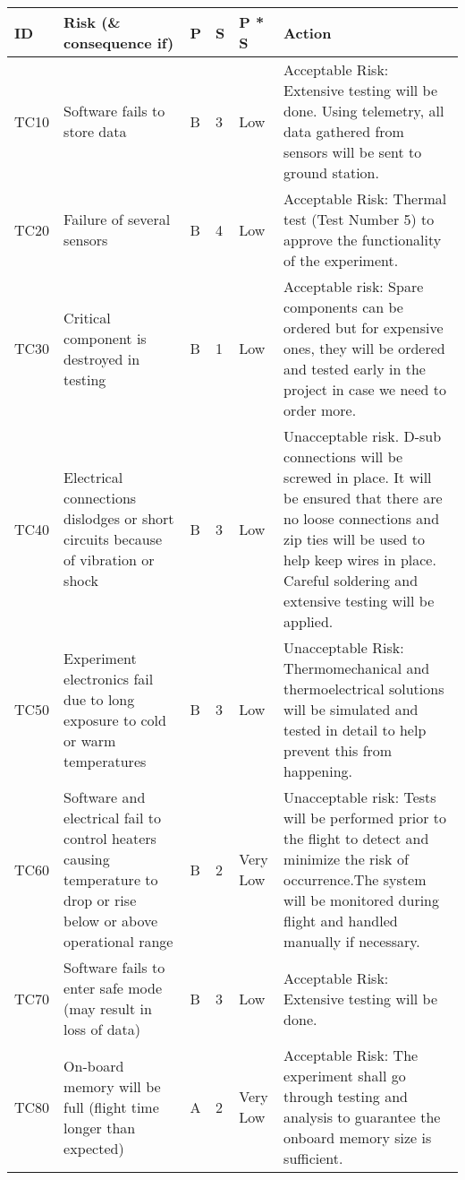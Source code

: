 


\begin{longtable}{|m{}| m{} |m{} |m{}|m{}| m{}|}

\hline
\textbf{ID} & \textbf{Risk (\& consequence if)} & \textbf{P} & \textbf{S} & \textbf{P * S} & \textbf{Action} \\ \hline
TC10 & Software fails to store data & B & 3 & \cellcolor[HTML]{FCFF2F}Low & Acceptable Risk: Extensive testing will be done. Using telemetry, all data gathered from sensors will be sent to ground station. \\ \hline
TC20 & Failure of several sensors & B & 4 & \cellcolor[HTML]{FCFF2F}Low & Acceptable Risk: Thermal test (Test Number 5) to approve the functionality of the experiment. \\ \hline
TC30 & Critical component is destroyed in testing & B & 1 & \cellcolor[HTML]{FCFF2F}Low & Acceptable risk: Spare components can be ordered but for expensive ones, they will be ordered and tested early in the project in case we need to order more. \\ \hline
TC40 & Electrical connections dislodges or short circuits because of vibration or shock & B & 3 & \cellcolor[HTML]{FCFF2F}Low & Unacceptable risk. D-sub connections will be screwed in place. It will be ensured that there are no loose connections and zip ties will be used to help keep wires in place. Careful soldering and extensive testing will be applied. \\ \hline
TC50 & Experiment electronics fail due to long exposure to cold or warm temperatures & B & 3 & \cellcolor[HTML]{FCFF2F}Low & Unacceptable Risk: Thermomechanical and thermoelectrical solutions will be simulated and tested in detail to help prevent this from happening. \\ \hline
TC60 & Software and electrical fail to control heaters causing temperature to drop or rise below or above operational range & B & 2 & \cellcolor[HTML]{34FF34}Very Low & Unacceptable risk: Tests will be performed prior to the flight to detect and minimize the risk of occurrence.The system will be monitored during flight and handled manually if necessary. \\ \hline
TC70 & Software fails to enter safe mode (may result in loss of data) & B & 3 & \cellcolor[HTML]{FCFF2F}Low & Acceptable Risk: Extensive testing will be done. \\ \hline
TC80 & On-board memory will be full (flight time longer than expected) & A & 2 & \cellcolor[HTML]{34FF34}Very Low & Acceptable Risk: The experiment shall go through testing and analysis to guarantee the onboard memory size is sufficient.\\ \hline

\end{longtable}
